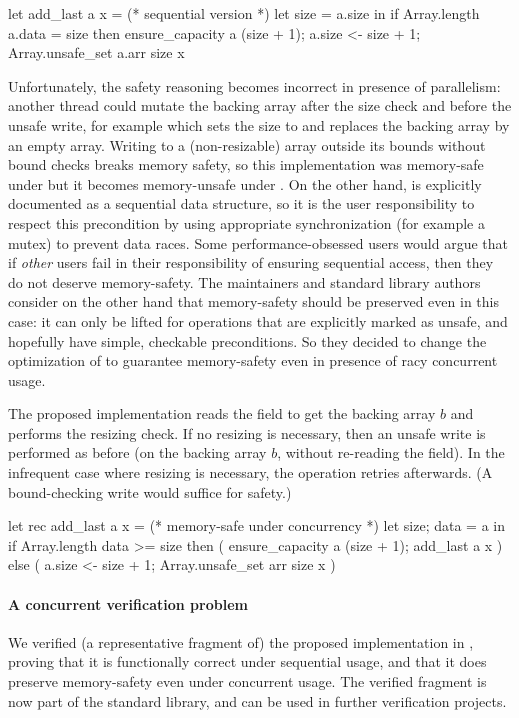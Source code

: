 \begin{ocamlcode}
let add_last a x = (* sequential version *)
  let size = a.size in
  if Array.length a.data = size then ensure_capacity a (size + 1);
  a.size <- size + 1;
  Array.unsafe_set a.arr size x
\end{ocamlcode}

Unfortunately, the safety reasoning becomes incorrect in presence of parallelism: another thread could mutate the backing array after the size check and before the unsafe write, for example  which sets the size to  and replaces the backing array by an empty array.
Writing to a (non-resizable) array outside its bounds without bound checks breaks memory safety, so this implementation was memory-safe under \OCamlFour but it becomes memory-unsafe under \OCamlFive. On the other hand,  is explicitly documented as a sequential data structure, so it is the user responsibility to respect this precondition by using appropriate synchronization (for example a mutex) to prevent data races. Some performance-obsessed users would argue that if \emph{other} users fail in their responsibility of ensuring sequential access, then they do not deserve memory-safety. The \OCaml maintainers and standard library authors consider on the other hand that memory-safety should be preserved even in this case: it can only be lifted for operations that are explicitly marked as unsafe, and hopefully have simple, checkable preconditions. So they decided to change the optimization of  to guarantee memory-safety even in presence of racy concurrent usage.

The proposed implementation reads the  field to get the backing array $b$ and performs the resizing check. If no resizing is necessary, then an unsafe write is performed as before (on the backing array $b$, without re-reading the  field). In the infrequent case where resizing is necessary, the operation retries afterwards. (A bound-checking write would suffice for safety.)

\begin{ocamlcode}
let rec add_last a x = (* memory-safe under concurrency *)
  let {size; data} = a in
  if Array.length data >= size
  then ( ensure_capacity a (size + 1); add_last a x )
  else ( a.size <- size + 1; Array.unsafe_set arr size x )
\end{ocamlcode}

\paragraph{A concurrent verification problem} We verified (a representative fragment of) the proposed  implementation in \ZooLang, proving that it is functionally correct under sequential usage, and that it does preserve memory-safety even under concurrent usage. The verified fragment is now part of the \Zoo standard library, and can be used in further verification projects.

